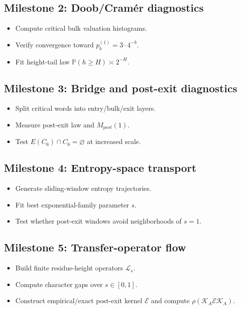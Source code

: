 \documentclass[11pt]{article}
\newcommand{\Prob}{\mathbb P}
\begin{document}
\subsection*{Milestone 2: Doob/Cram\'er diagnostics}
\begin{itemize}
  \item Compute critical bulk valuation histograms.
  \item Verify convergence toward $p_b^{(1)}=3\cdot4^{-b}$.
  \item Fit height-tail law $\Prob(h\ge H)\asymp2^{-H}$.
\end{itemize}

\subsection*{Milestone 3: Bridge and post-exit diagnostics}
\begin{itemize}
  \item Split critical words into entry/bulk/exit layers.
  \item Measure post-exit law and $M_{post}(1)$.
  \item Test $E(C_6)\cap C_6=\varnothing$ at increased scale.
\end{itemize}

\subsection*{Milestone 4: Entropy-space transport}
\begin{itemize}
  \item Generate sliding-window entropy trajectories.
  \item Fit best exponential-family parameter $s$.
  \item Test whether post-exit windows avoid neighborhoods of $s=1$.
\end{itemize}

\subsection*{Milestone 5: Transfer-operator flow}
\begin{itemize}
  \item Build finite residue-height operators $\mathcal L_s$.
  \item Compute character gaps over $s\in[0,1]$.
  \item Construct empirical/exact post-exit kernel $\mathcal E$ and compute $\rho(\mathcal K_A\mathcal E\mathcal K_A)$.
\end{itemize}
\end{document}
